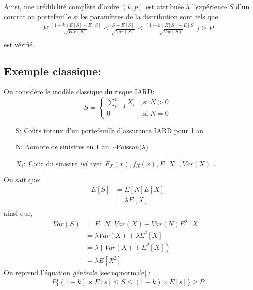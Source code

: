 \documentclass[11pt,french]{report}
\begin{document}
Ainsi, une crédibilité complète d'ordre $(k,p)$ est attribuée à l'expérience $S$ d'un contrat ou portefeuille si les paramètres de la distribution sont tels que 
\begin{align*}
P\Bigg( \frac{(1 - k)E[S] - E[S]}{\sqrt{Var(S)}} \leq \frac{S - E[S]}{\sqrt{Var(S)}} \leq \frac{(1 + k)E[S] - E[S]}{\sqrt{Var(S)}}\Bigg) \geq P \\
\end{align*}
est vérifié.
\subsection{Exemple classique:}
On considère le modèle classique du risque IARD:
\begin{equation}
	S =
     \left\{
     \begin{array}{rl}
      \sum_{i = 1}^{n} X_{i} &, \text{si } N > 0 \\
      0 &, \text{si }N = 0
     \end{array}
     \right.
\end{equation}
\begin{itemize}
\item[S:] Coûts totaux d'un portefeuille d'assurance IARD pour 1 an
\item[N:] Nombre de sinistres en 1 an $ \sim$Poisson($\lambda$)
\item[$X_i:$] Coût du sinistre \emph{iid} avec $F_X(x),f_X(x), E[X], Var(X)...$
\end{itemize}
On sait que:
\begin{align*}
E[S] &= E[N] E[X] \\
&= \lambda E[X]\\
\end{align*}
ainsi que,
\begin{align*}
Var(S) &= E[N]Var(X) + Var(N)E^{2}[X]\\
&= \lambda Var(X) + \lambda E^{2}[X]\\
&= \lambda (Var(X) + E^{2}[X])\\
&= \lambda E[X^2]
\end{align*} 
On reprend l'équation \emph{générale} \ref{sec:eq:normale} :
\begin{align*}
P \Big \lbrace(1 - k) \times E[s] \leq S \leq(1 + k)\times E[s]\Big\rbrace \geq P
\end{align*}
\end{document}
